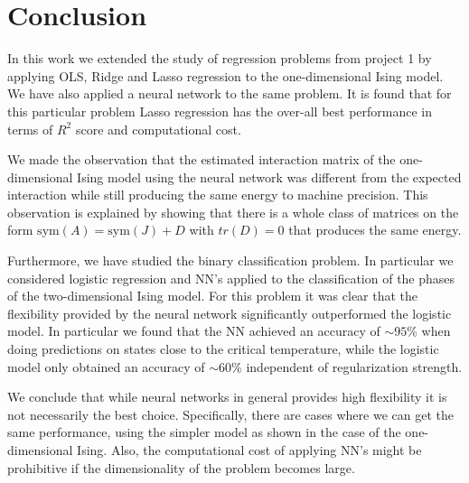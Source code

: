 \documentclass[a4paper, twocolumn]{article}
\begin{document}
\section{Conclusion}
In this work we extended the study of regression problems from project 1 by applying OLS, Ridge and Lasso regression 
to the one-dimensional Ising model. We have also applied a neural network to the same problem. It is found that for this 
particular problem Lasso regression has the over-all best performance in terms of $R^2$ score and computational cost. 

We made the observation that the estimated interaction matrix of the one-dimensional Ising model using the neural network 
was different from the expected interaction while still producing the same energy to machine precision. This observation is 
explained by showing that there is a whole class of matrices on the form $\text{sym}(A) = \text{sym}(J) + D$ with $tr(D) = 0$ 
that produces the same energy. 

Furthermore, we have studied the binary classification problem. In particular we considered logistic regression and NN's 
applied to the classification of the phases of the two-dimensional Ising model. For this problem it was clear that the 
flexibility provided by the neural network significantly outperformed the logistic model. In particular we found that 
the NN achieved an accuracy of $\sim 95$\% when doing predictions on states close to the critical temperature, 
while the logistic model only obtained an accuracy of $\sim 60$\% independent of regularization strength. 

We conclude that while neural networks in general provides high flexibility it is not necessarily the best choice. 
Specifically, there are cases where we can get the same performance, using the simpler model as shown in the case of the 
one-dimensional Ising. Also, the computational cost of applying NN's might be prohibitive if the dimensionality of the problem 
becomes large.

\onecolumn{
\printbibliography
}
\end{document}
